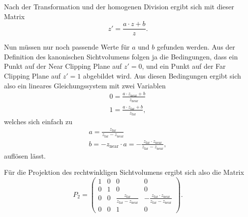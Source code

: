 Nach der Transformation und der homogenen Division ergibt sich mit dieser Matrix
\begin{equation}
 z' = \frac{a \cdot z + b}{z}.
\end{equation}

Nun müssen nur noch passende Werte für $a$ und $b$ gefunden werden. Aus der Definition des kanonischen Sichtvolumens folgen ja die Bedingungen, dass ein Punkt auf der Near Clipping Plane auf $z'=0$, und ein Punkt auf der Far Clipping Plane auf $z'=1$ abgebildet wird. Aus diesen Bedingungen ergibt sich also ein lineares Gleichungssystem mit zwei Variablen
\begin{equation}
\begin{split}
 0 = \frac{a \cdot z_\mathrm{near} + b}{z_\mathrm{near}} \\
 1 = \frac{a \cdot z_\mathrm{far} + b}{z_\mathrm{far}},
\end{split}
\end{equation}
welches sich einfach zu
\begin{equation}
\begin{split}
 a = \frac{z_\mathrm{far}}{z_\mathrm{far}-z_\mathrm{near}} \\
 b = -z_\mathrm{near} \cdot a = -\frac{z_\mathrm{far} \cdot z_\mathrm{near}}{z_\mathrm{far}-z_\mathrm{near}},
\end{split} 
\end{equation}
auflösen lässt. 

Für die Projektion des rechtwinkligen Sichtvolumens ergibt sich also die Matrix
\begin{equation}
 P_2 = \begin{pmatrix}
  1 & 0 & 0 & 0 \\
  0 & 1 & 0 & 0 \\
  0 & 0 & \frac{z_\mathrm{far}}{z_\mathrm{far}-z_\mathrm{near}} & -\frac{z_\mathrm{far} \cdot z_\mathrm{near}}{z_\mathrm{far}-z_\mathrm{near}} \\
  0 & 0 & 1 & 0
 \end{pmatrix}.
\end{equation}

